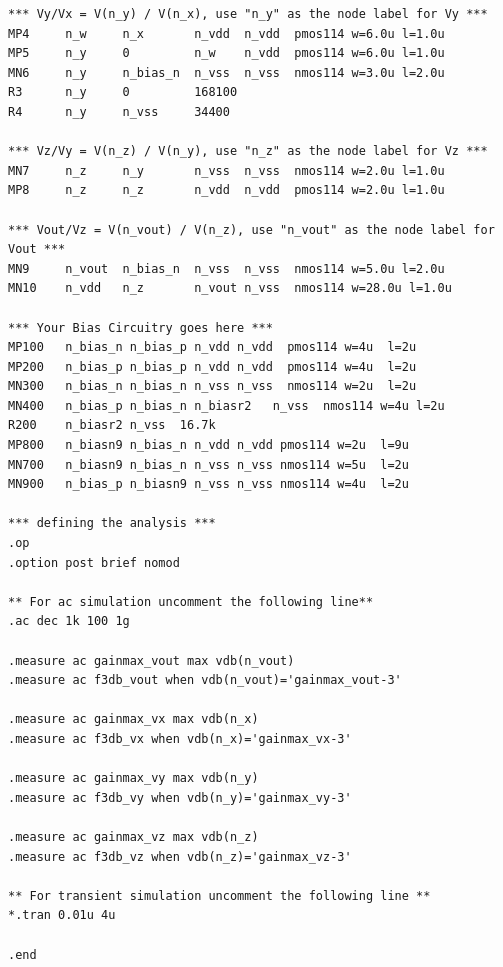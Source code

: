 \documentclass[12pt,a4paper]{article}
\begin{document}
\begin{lstlisting}
*** Vy/Vx = V(n_y) / V(n_x), use "n_y" as the node label for Vy ***
MP4     n_w     n_x       n_vdd  n_vdd  pmos114 w=6.0u l=1.0u
MP5     n_y     0         n_w    n_vdd  pmos114 w=6.0u l=1.0u
MN6     n_y     n_bias_n  n_vss  n_vss  nmos114 w=3.0u l=2.0u
R3      n_y     0         168100
R4      n_y     n_vss     34400

*** Vz/Vy = V(n_z) / V(n_y), use "n_z" as the node label for Vz ***
MN7     n_z     n_y       n_vss  n_vss  nmos114 w=2.0u l=1.0u
MP8     n_z     n_z       n_vdd  n_vdd  pmos114 w=2.0u l=1.0u

*** Vout/Vz = V(n_vout) / V(n_z), use "n_vout" as the node label for Vout ***
MN9     n_vout  n_bias_n  n_vss  n_vss  nmos114 w=5.0u l=2.0u
MN10    n_vdd   n_z       n_vout n_vss  nmos114 w=28.0u l=1.0u

*** Your Bias Circuitry goes here ***
MP100   n_bias_n n_bias_p n_vdd n_vdd  pmos114 w=4u  l=2u
MP200   n_bias_p n_bias_p n_vdd n_vdd  pmos114 w=4u  l=2u
MN300   n_bias_n n_bias_n n_vss n_vss  nmos114 w=2u  l=2u
MN400   n_bias_p n_bias_n n_biasr2   n_vss  nmos114 w=4u l=2u
R200    n_biasr2 n_vss  16.7k
MP800   n_biasn9 n_bias_n n_vdd n_vdd pmos114 w=2u  l=9u
MN700   n_biasn9 n_bias_n n_vss n_vss nmos114 w=5u  l=2u
MN900   n_bias_p n_biasn9 n_vss n_vss nmos114 w=4u  l=2u

*** defining the analysis ***
.op
.option post brief nomod

** For ac simulation uncomment the following line**
.ac dec 1k 100 1g

.measure ac gainmax_vout max vdb(n_vout)
.measure ac f3db_vout when vdb(n_vout)='gainmax_vout-3'

.measure ac gainmax_vx max vdb(n_x)
.measure ac f3db_vx when vdb(n_x)='gainmax_vx-3'

.measure ac gainmax_vy max vdb(n_y)
.measure ac f3db_vy when vdb(n_y)='gainmax_vy-3'

.measure ac gainmax_vz max vdb(n_z)
.measure ac f3db_vz when vdb(n_z)='gainmax_vz-3'

** For transient simulation uncomment the following line **
*.tran 0.01u 4u

.end
\end{lstlisting}
%
\end{document}
